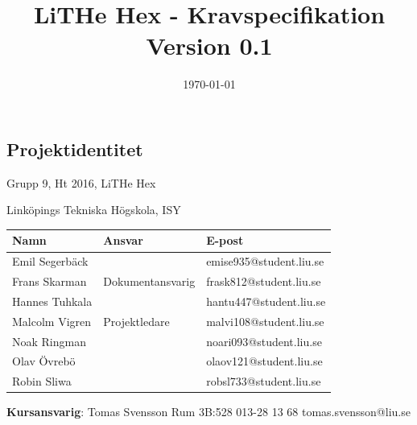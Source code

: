 \documentclass[a4paper,titlepage,12pt]{article}
\begin{document}
    \title{\textbf{LiTHe Hex - Kravspecifikation} \\
        \vspace*{0.5\baselineskip}
        Version 0.1}

    \date{\today}

	\maketitle
	\newpage

	
	\begin{center}


		\section*{Projektidentitet}
		Grupp 9, Ht 2016, LiTHe Hex

		Linköpings Tekniska Högskola, ISY

		\begin{table}[h]
			\begin{tabular}[pos]{| l | l | l |}
				\hline
				\textbf{Namn} & \textbf{Ansvar} & \textbf{E-post} \\ \hline
				Emil Segerbäck & & emise935@student.liu.se \\ \hline
				Frans Skarman & Dokumentansvarig & frask812@student.liu.se \\ \hline
				Hannes Tuhkala & & hantu447@student.liu.se \\ \hline
				Malcolm Vigren & Projektledare & malvi108@student.liu.se \\ \hline
				Noak Ringman &  & noari093@student.liu.se \\ \hline
				Olav Övrebö &  & olaov121@student.liu.se \\ \hline
				Robin Sliwa &  & robsl733@student.liu.se \\ \hline
			\end{tabular}
		\end{table}


		\textbf{Kursansvarig}: Tomas Svensson Rum 3B:528 013-28 13 68 tomas.svensson@liu.se


		
		\newpage




\end{center}
\end{document}
